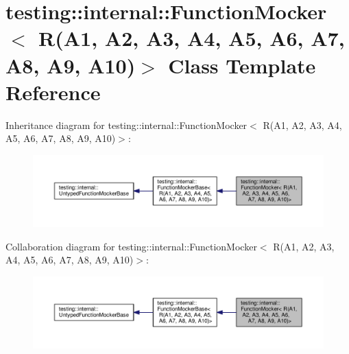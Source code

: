 \hypertarget{classtesting_1_1internal_1_1FunctionMocker_3_01R_07A1_00_01A2_00_01A3_00_01A4_00_01A5_00_01A6_0079295c90ba14a714e84d5a856a5b50dd}{}\section{testing\+:\+:internal\+:\+:Function\+Mocker$<$ R(A1, A2, A3, A4, A5, A6, A7, A8, A9, A10)$>$ Class Template Reference}
\label{classtesting_1_1internal_1_1FunctionMocker_3_01R_07A1_00_01A2_00_01A3_00_01A4_00_01A5_00_01A6_0079295c90ba14a714e84d5a856a5b50dd}


Inheritance diagram for testing\+:\+:internal\+:\+:Function\+Mocker$<$ R(A1, A2, A3, A4, A5, A6, A7, A8, A9, A10)$>$\+:\nopagebreak
\begin{figure}[H]
\begin{center}
\leavevmode
\includegraphics[width=350pt]{classtesting_1_1internal_1_1FunctionMocker_3_01R_07A1_00_01A2_00_01A3_00_01A4_00_01A5_00_01A6_007afc3ae8e923b3ee809060b6741a03ef}
\end{center}
\end{figure}


Collaboration diagram for testing\+:\+:internal\+:\+:Function\+Mocker$<$ R(A1, A2, A3, A4, A5, A6, A7, A8, A9, A10)$>$\+:\nopagebreak
\begin{figure}[H]
\begin{center}
\leavevmode
\includegraphics[width=350pt]{classtesting_1_1internal_1_1FunctionMocker_3_01R_07A1_00_01A2_00_01A3_00_01A4_00_01A5_00_01A6_008f8b249ed8a403a1830a3f61f13ab625}
\end{center}
\end{figure}
